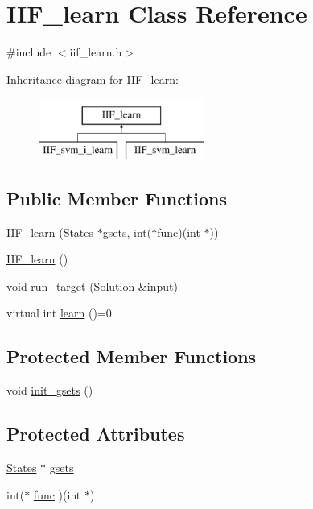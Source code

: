 \hypertarget{classIIF__learn}{}\section{I\+I\+F\+\_\+learn Class Reference}
\label{classIIF__learn}


{\ttfamily \#include $<$iif\+\_\+learn.\+h$>$}

Inheritance diagram for I\+I\+F\+\_\+learn\+:\begin{figure}[H]
\begin{center}
\leavevmode
\includegraphics[height=2.000000cm]{classIIF__learn}
\end{center}
\end{figure}
\subsection*{Public Member Functions}
\begin{DoxyCompactItemize}
\item 
\hyperlink{classIIF__learn_a52f7f9a9226409373229a5f9ede446ad}{I\+I\+F\+\_\+learn} (\hyperlink{classStates}{States} $\ast$\hyperlink{classIIF__learn_a2c2157269ef33cd2881ed48c5b38946a}{gsets}, int($\ast$\hyperlink{classIIF__learn_a19119795c6b5360d2e8b3ed2073642d6}{func})(int $\ast$))
\item 
\hyperlink{classIIF__learn_ac0f1fb59ddca48fe5414de299e32730e}{I\+I\+F\+\_\+learn} ()
\item 
void \hyperlink{classIIF__learn_ad91ea13d3761a011d8c75af8e9b54deb}{run\+\_\+target} (\hyperlink{classSolution}{Solution} \&input)
\item 
virtual int \hyperlink{classIIF__learn_aba3602a34e425112a11176c49171dced}{learn} ()=0
\end{DoxyCompactItemize}
\subsection*{Protected Member Functions}
\begin{DoxyCompactItemize}
\item 
void \hyperlink{classIIF__learn_aec195ce429a20cb1503e4f5d1a9bae0e}{init\+\_\+gsets} ()
\end{DoxyCompactItemize}
\subsection*{Protected Attributes}
\begin{DoxyCompactItemize}
\item 
\hyperlink{classStates}{States} $\ast$ \hyperlink{classIIF__learn_a2c2157269ef33cd2881ed48c5b38946a}{gsets}
\item 
int($\ast$ \hyperlink{classIIF__learn_a19119795c6b5360d2e8b3ed2073642d6}{func} )(int $\ast$)
\end{DoxyCompactItemize}


